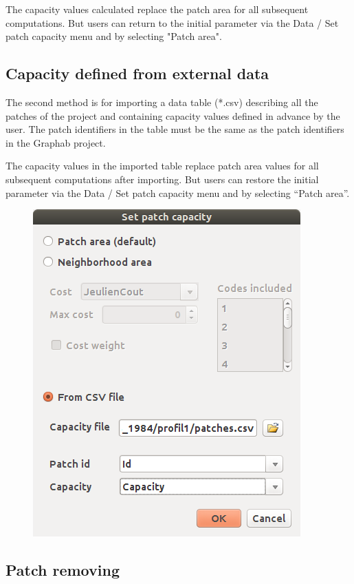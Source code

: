 \documentclass{article}
\begin{document}
The capacity values calculated replace the patch area for all subsequent computations. But users can return to the initial parameter via the Data / Set patch capacity menu and by selecting "Patch area".

\subsection{Capacity defined from external data}

The second method is for importing a data table (*.csv) describing all the patches of the project and containing capacity values defined in advance by the user. The patch identifiers in the table must be the same as the patch identifiers in the Graphab project.

The capacity values in the imported table replace patch area values for all subsequent computations after importing. But users can restore the initial parameter via the Data / Set patch capacity menu and by selecting “Patch area”.

\begin{figure}[H]
	\includegraphics[scale=0.5]{img/manual-en_img9.png}
\end{figure}

\subsection{Patch removing}
\end{document}
